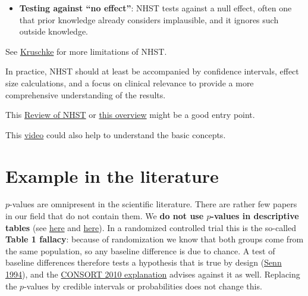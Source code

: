 \documentclass[
]{book}
\begin{document}
\begin{itemize}
  \begin{quote}
  \textbf{Try it yourself.} In the animation
  \href{https://jdegenfellner.github.io/Script_QM1_ZHAW/animations/19_CI_naechste_Schaetzung.html}{The next estimate and the current confidence interval}
  you set the confidence level and check by simulation how often the estimate of a repeated experiment falls inside the first interval.
  \end{quote}
\item
  \textbf{Testing against ``no effect''}: NHST tests against a null effect, often one that prior knowledge
  already considers implausible, and it ignores such outside knowledge.
\end{itemize}

See \href{https://gwern.net/doc/statistics/bayes/2012-kruschke.pdf}{Kruschke} for more limitations of NHST.

In practice, NHST should at least be accompanied by confidence intervals,
effect size calculations, and a focus on clinical relevance to provide
a more comprehensive understanding of the results.

This \href{https://f1000research.com/articles/4-621/v3}{Review of NHST} or
\href{https://en.wikipedia.org/wiki/Statistical_hypothesis_test}{this overview} might be a good entry point.

This \href{https://www.youtube.com/watch?v=FZ2_hzMyJpY&ab_channel=VeryNormal}{video} could also help to understand the basic concepts.

\section{Example in the literature}\label{example-in-the-literature}

\(p\)-values are omnipresent in the scientific literature. There are rather few papers in our field that do not contain them.
We \textbf{do not use \(p\)-values in descriptive tables}
(see \href{https://epitodate.com/the-balance-test-fallacy-why-you-shouldnt-put-p-values-in-table-1/}{here} and
\href{https://www.acpjournals.org/doi/10.7326/0003-4819-147-8-200710160-00010-w1}{here}).
In a randomized controlled trial this is the so-called \textbf{Table 1 fallacy}: because of randomization
we know that both groups come from the same population, so any baseline difference is due to chance.
A test of baseline differences therefore tests a hypothesis that is true by design
(\href{https://doi.org/10.1002/sim.4780131703}{Senn 1994}), and the
\href{https://doi.org/10.1136/bmj.c869}{CONSORT 2010 explanation} advises against it as well.
Replacing the \(p\)-values by credible intervals or probabilities does not change this.
\end{document}
